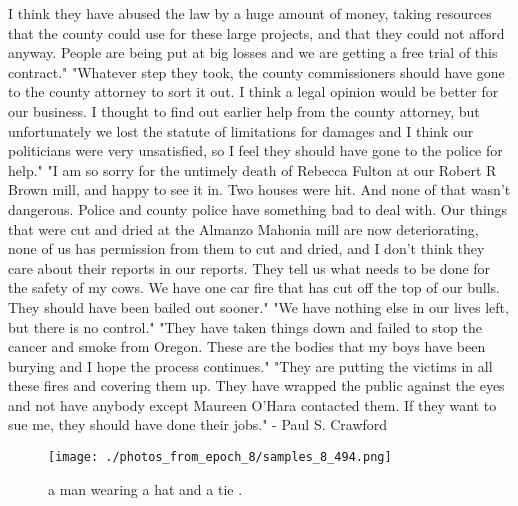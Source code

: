 \documentclass{article}%
\begin{document}
I think they have abused the law by a huge amount of money, taking resources that the county could use for these large projects, and that they could not afford anyway. People are being put at big losses and we are getting a free trial of this contract."\newline%
"Whatever step they took, the county commissioners should have gone to the county attorney to sort it out. I think a legal opinion would be better for our business. I thought to find out earlier help from the county attorney, but unfortunately we lost the statute of limitations for damages and I think our politicians were very unsatisfied, so I feel they should have gone to the police for help."\newline%
"I am so sorry for the untimely death of Rebecca Fulton at our Robert R Brown mill, and happy to see it in. Two houses were hit. And none of that wasn't dangerous. Police and county police have something bad to deal with.\newline%
Our things that were cut and dried at the Almanzo Mahonia mill are now deteriorating, none of us has permission from them to cut and dried, and I don't think they care about their reports in our reports. They tell us what needs to be done for the safety of my cows. We have one car fire that has cut off the top of our bulls. They should have been bailed out sooner."\newline%
"We have nothing else in our lives left, but there is no control."\newline%
"They have taken things down and failed to stop the cancer and smoke from Oregon. These are the bodies that my boys have been burying and I hope the process continues."\newline%
"They are putting the victims in all these fires and covering them up. They have wrapped the public against the eyes and not have anybody except Maureen O'Hara contacted them. If they want to sue me, they should have done their jobs."\newline%
{-} Paul S. Crawford\newline%

%


\begin{figure}[h!]%
\centering%
\texttt{[image: ./photos\_from\_epoch\_8/samples\_8\_494.png]}%
\caption{a man wearing a hat and a tie .}%
\end{figure}

%
\end{document}

